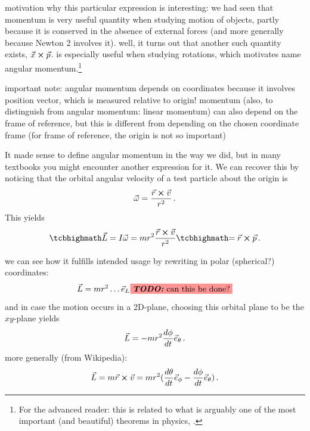 \documentclass[../class_mech_main.tex]{subfiles}
\begin{document}
motivation why this particular expression is interesting: we had seen that momentum is very useful quantity when studying motion of objects, partly because it is conserved in the absence of external forces (and more generally because Newton 2 involves it). well, it turns out that another such quantity exists, $\vec{x} \cross \vec{p}$. is especially useful when studying rotations, which motivates name angular momentum.\footnote{For the advanced reader: this is related to what is arguably one of the most important (and beautiful) theorems in physics, .}

important note: angular momentum depends on coordinates because it involves position vector, which is measured relative to origin! momentum (also, to distinguish from angular momentum: linear momentum) can also depend on the frame of reference, but this is different from depending on the chosen coordinate frame (for frame of reference, the origin is not so important)


It made sense to define angular momentum in the way we did, but in many textbooks you might encounter another expression for it. We can recover this by noticing that the orbital angular velocity of a test particle about the origin is
\begin{equation}
	\vec{\omega} = \frac{\vec{r} \cross \vec{v}}{r^2} \, .
\end{equation}
This yields
\begin{equation}
    \eqbox{\vec{L}} = I \vec{\omega} = m r^2 \frac{\vec{r} \cross \vec{v}}{r^2} \eqbox{= \vec{r} \cross \vec{p}} \, .
\end{equation}



we can see how it fulfills intended usage by rewriting in polar (spherical?) coordinates:
\begin{equation}
    \vec{L} = m r^2 \dots \vec{e}_L \todo{can this be done?}
\end{equation}
and in case the motion occurs in a 2D-plane, choosing this orbital plane to be the $xy$-plane yields
\begin{equation}
    \vec{L} = - m r^2 \dv{\phi}{t} \vec{e}_\theta
	\, .
\end{equation}
more generally (from Wikipedia):
\begin{equation}
	\vec{L} = m \vec{r} \cross \vec{v} = m r^2 (\dv{\theta}{t} \vec{e}_\phi - \dv{\phi}{t} \vec{e}_\theta)
	\, .
\end{equation}
\end{document}
